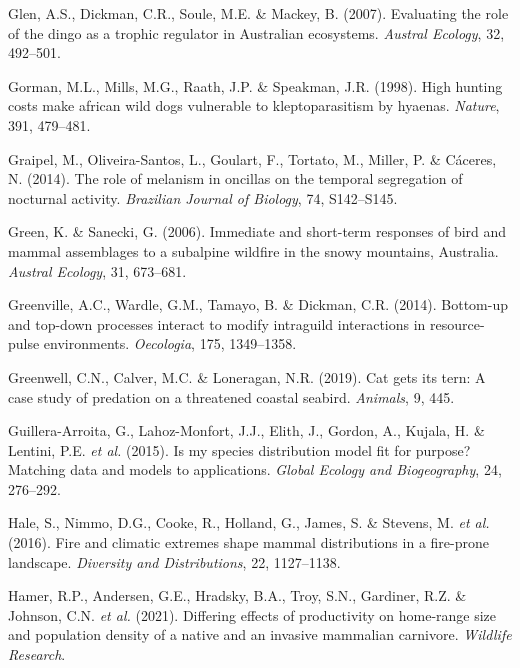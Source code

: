 \documentclass[11pt,a4paper,titlepage,twoside,openright]{style/unimelbthesis}
\begin{document}
\begin{mainmatter}
\leavevmode\hypertarget{ref-glen2007evaluating}{}%
Glen, A.S., Dickman, C.R., Soule, M.E. \& Mackey, B. (2007). Evaluating the role of the dingo as a trophic regulator in Australian ecosystems. \emph{Austral Ecology}, 32, 492--501.

\leavevmode\hypertarget{ref-gorman1998high}{}%
Gorman, M.L., Mills, M.G., Raath, J.P. \& Speakman, J.R. (1998). High hunting costs make african wild dogs vulnerable to kleptoparasitism by hyaenas. \emph{Nature}, 391, 479--481.

\leavevmode\hypertarget{ref-graipel2014role}{}%
Graipel, M., Oliveira-Santos, L., Goulart, F., Tortato, M., Miller, P. \& Cáceres, N. (2014). The role of melanism in oncillas on the temporal segregation of nocturnal activity. \emph{Brazilian Journal of Biology}, 74, S142--S145.

\leavevmode\hypertarget{ref-green2006immediate}{}%
Green, K. \& Sanecki, G. (2006). Immediate and short-term responses of bird and mammal assemblages to a subalpine wildfire in the snowy mountains, Australia. \emph{Austral Ecology}, 31, 673--681.

\leavevmode\hypertarget{ref-greenville2014bottom}{}%
Greenville, A.C., Wardle, G.M., Tamayo, B. \& Dickman, C.R. (2014). Bottom-up and top-down processes interact to modify intraguild interactions in resource-pulse environments. \emph{Oecologia}, 175, 1349--1358.

\leavevmode\hypertarget{ref-greenwell2019cat}{}%
Greenwell, C.N., Calver, M.C. \& Loneragan, N.R. (2019). Cat gets its tern: A case study of predation on a threatened coastal seabird. \emph{Animals}, 9, 445.

\leavevmode\hypertarget{ref-guillera2015my}{}%
Guillera-Arroita, G., Lahoz-Monfort, J.J., Elith, J., Gordon, A., Kujala, H. \& Lentini, P.E. \emph{et al.} (2015). Is my species distribution model fit for purpose? Matching data and models to applications. \emph{Global Ecology and Biogeography}, 24, 276--292.

\leavevmode\hypertarget{ref-hale2016fire}{}%
Hale, S., Nimmo, D.G., Cooke, R., Holland, G., James, S. \& Stevens, M. \emph{et al.} (2016). Fire and climatic extremes shape mammal distributions in a fire-prone landscape. \emph{Diversity and Distributions}, 22, 1127--1138.

\leavevmode\hypertarget{ref-hamer2021differing}{}%
Hamer, R.P., Andersen, G.E., Hradsky, B.A., Troy, S.N., Gardiner, R.Z. \& Johnson, C.N. \emph{et al.} (2021). Differing effects of productivity on home-range size and population density of a native and an invasive mammalian carnivore. \emph{Wildlife Research}.


\end{mainmatter}
\end{document}
